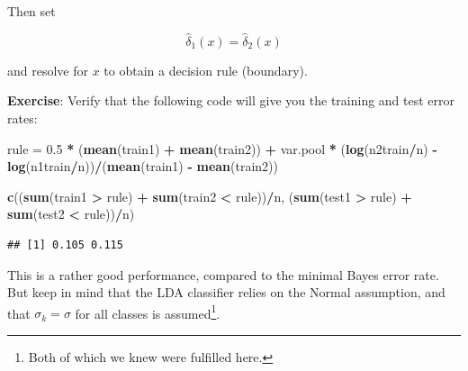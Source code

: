 \documentclass[10pt,ignorenonframetext,]{beamer}
\newenvironment{Shaded}{\begin{snugshade}}{\end{snugshade}}
\newcommand{\KeywordTok}[1]{\textcolor[rgb]{0.13,0.29,0.53}{\textbf{#1}}}
\newcommand{\FloatTok}[1]{\textcolor[rgb]{0.00,0.00,0.81}{#1}}
\newcommand{\StringTok}[1]{\textcolor[rgb]{0.31,0.60,0.02}{#1}}
\newcommand{\OperatorTok}[1]{\textcolor[rgb]{0.81,0.36,0.00}{\textbf{#1}}}
\newcommand{\NormalTok}[1]{#1}
\begin{document}
\begin{frame}[fragile]

Then set

\[\hat\delta_1(x) = \hat\delta_2(x)\]

and resolve for \(x\) to obtain a decision rule (boundary).

\vspace{2mm} \textbf{Exercise}: Verify that the following code will give
you the training and test error rates:

\scriptsize

\begin{Shaded}
\begin{Highlighting}[]
\NormalTok{rule =}\StringTok{ }\FloatTok{0.5} \OperatorTok{*}\StringTok{ }\NormalTok{(}\KeywordTok{mean}\NormalTok{(train1) }\OperatorTok{+}\StringTok{ }\KeywordTok{mean}\NormalTok{(train2)) }\OperatorTok{+}\StringTok{ }\NormalTok{var.pool }\OperatorTok{*}\StringTok{ }\NormalTok{(}\KeywordTok{log}\NormalTok{(n2train}\OperatorTok{/}\NormalTok{n) }\OperatorTok{-}\StringTok{ }
\StringTok{    }\KeywordTok{log}\NormalTok{(n1train}\OperatorTok{/}\NormalTok{n))}\OperatorTok{/}\NormalTok{(}\KeywordTok{mean}\NormalTok{(train1) }\OperatorTok{-}\StringTok{ }\KeywordTok{mean}\NormalTok{(train2))}

\KeywordTok{c}\NormalTok{((}\KeywordTok{sum}\NormalTok{(train1 }\OperatorTok{>}\StringTok{ }\NormalTok{rule) }\OperatorTok{+}\StringTok{ }\KeywordTok{sum}\NormalTok{(train2 }\OperatorTok{<}\StringTok{ }\NormalTok{rule))}\OperatorTok{/}\NormalTok{n, (}\KeywordTok{sum}\NormalTok{(test1 }\OperatorTok{>}\StringTok{ }\NormalTok{rule) }\OperatorTok{+}\StringTok{ }\KeywordTok{sum}\NormalTok{(test2 }\OperatorTok{<}\StringTok{ }
\StringTok{    }\NormalTok{rule))}\OperatorTok{/}\NormalTok{n)}
\end{Highlighting}
\end{Shaded}

\begin{verbatim}
## [1] 0.105 0.115
\end{verbatim}

\normalsize

This is a rather good performance, compared to the minimal Bayes error
rate. But keep in mind that the LDA classifier relies on the Normal
assumption, and that \(\sigma_k=\sigma\) for all classes is
assumed\footnote{Both of which we knew were fulfilled here.}.

\end{frame}
\end{document}
